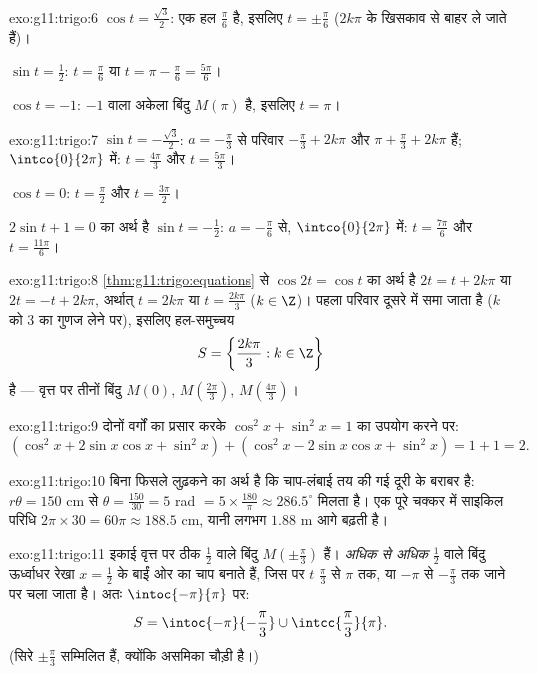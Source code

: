 \begin{solution}{exo:g11:trigo:6}
$\cos t = \frac{\sqrt3}{2}$: एक हल $\frac\pi6$ है, इसलिए $t = \pm\frac\pi6$ ($2k\pi$ के खिसकाव  से बाहर ले जाते हैं)।

$\sin t = \frac12$: $t = \frac\pi6$ या $t = \pi - \frac\pi6 =
\frac{5\pi}{6}$।

$\cos t = -1$:  $-1$ वाला अकेला बिंदु $M(\pi)$ है, इसलिए $t = \pi$।
\end{solution}

\begin{solution}{exo:g11:trigo:7}
$\sin t = -\frac{\sqrt3}{2}$: $a = -\frac\pi3$ से परिवार $-\frac\pi3 + 2k\pi$ और $\pi + \frac\pi3 + 2k\pi$ हैं; $\intco{0}{2\pi}$ में: $t = \frac{4\pi}{3}$ और $t = \frac{5\pi}{3}$।

$\cos t = 0$: $t = \frac\pi2$ और $t = \frac{3\pi}{2}$।

$2\sin t + 1 = 0$ का अर्थ है $\sin t = -\frac12$: $a = -\frac\pi6$ से, $\intco{0}{2\pi}$ में: $t = \frac{7\pi}{6}$ और $t = \frac{11\pi}{6}$।
\end{solution}

\begin{solution}{exo:g11:trigo:8}
\cref{thm:g11:trigo:equations} से $\cos 2t = \cos t$ का अर्थ है $2t = t + 2k\pi$ या $2t = -t + 2k\pi$, अर्थात् $t = 2k\pi$ या $t = \frac{2k\pi}{3}$ ($k \in \Z$)। पहला
परिवार दूसरे में समा जाता है ($k$ को $3$ का गुणज लेने पर), इसलिए
हल-समुच्चय
\[
S = \left\{\frac{2k\pi}{3} : k \in \Z\right\}
\]
है --- वृत्त पर तीनों बिंदु $M(0)$, $M\!\left(\frac{2\pi}{3}\right)$, $M\!\left(\frac{4\pi}{3}\right)$।
\end{solution}

\begin{solution}{exo:g11:trigo:9}
दोनों वर्गों का प्रसार करके $\cos^2 x + \sin^2 x = 1$ का उपयोग करने पर:
\[
(\cos^2 x + 2\sin x\cos x + \sin^2 x)
+ (\cos^2 x - 2\sin x\cos x + \sin^2 x)
= 1 + 1 = 2 .
\]
\end{solution}

\begin{solution}{exo:g11:trigo:10}
बिना फिसले लुढ़कने का अर्थ है कि चाप-लंबाई तय की गई दूरी के बराबर है: $r\theta = 150$
cm से $\theta = \frac{150}{30} = 5$ rad $= 5 \times \frac{180}{\pi} \approx
286.5^\circ$ मिलता है। एक पूरे चक्कर में साइकिल परिधि $2\pi \times 30 = 60\pi \approx 188.5$ cm, यानी
लगभग $1.88$ m आगे बढ़ती है।
\end{solution}

\begin{solution}{exo:g11:trigo:11}
इकाई वृत्त पर ठीक $\frac12$  वाले बिंदु $M\!\left(\pm\frac\pi3\right)$ हैं।  \emph{अधिक से अधिक} $\frac12$
वाले बिंदु ऊर्ध्वाधर रेखा $x = \frac12$ के बाईं ओर का चाप बनाते हैं, जिस पर $t$
$\frac\pi3$ से $\pi$ तक, या $-\pi$ से $-\frac\pi3$ तक जाने पर चला जाता है। अतः $\intoc{-\pi}{\pi}$ पर:
\[
S = \intoc{-\pi}{-\frac{\pi}{3}} \cup \intcc{\frac{\pi}{3}}{\pi}.
\]
(सिरे $\pm\frac\pi3$ सम्मिलित हैं, क्योंकि असमिका चौड़ी है।)
\end{solution}

